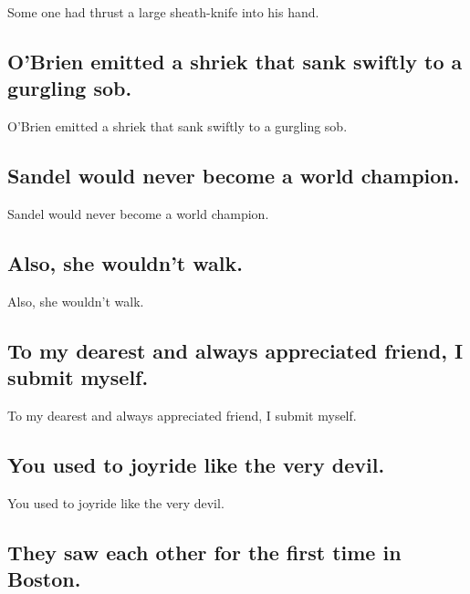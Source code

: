 \documentclass[]{article}
\begin{document}
Some one had thrust a large sheath-knife into his hand.

\hypertarget{obrien-emitted-a-shriek-that-sank-swiftly-to-a-gurgling-sob.}{%
\subsection{O'Brien emitted a shriek that sank swiftly to a gurgling
sob.}\label{obrien-emitted-a-shriek-that-sank-swiftly-to-a-gurgling-sob.}}

O'Brien emitted a shriek that sank swiftly to a gurgling sob.

\hypertarget{sandel-would-never-become-a-world-champion.}{%
\subsection{Sandel would never become a world
champion.}\label{sandel-would-never-become-a-world-champion.}}

Sandel would never become a world champion.

\hypertarget{also-she-wouldnt-walk.}{%
\subsection{Also, she wouldn't walk.}\label{also-she-wouldnt-walk.}}

Also, she wouldn't walk.

\hypertarget{to-my-dearest-and-always-appreciated-friend-i-submit-myself.}{%
\subsection{To my dearest and always appreciated friend, I submit
myself.}\label{to-my-dearest-and-always-appreciated-friend-i-submit-myself.}}

To my dearest and always appreciated friend, I submit myself.

\hypertarget{you-used-to-joyride-like-the-very-devil.}{%
\subsection{You used to joyride like the very
devil.}\label{you-used-to-joyride-like-the-very-devil.}}

You used to joyride like the very devil.

\hypertarget{they-saw-each-other-for-the-first-time-in-boston.}{%
\subsection{They saw each other for the first time in
Boston.}\label{they-saw-each-other-for-the-first-time-in-boston.}}
\end{document}
